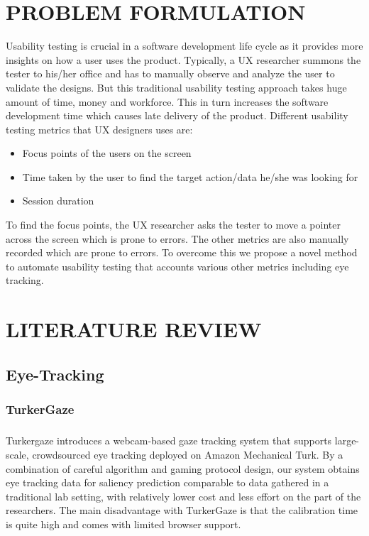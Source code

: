 \documentclass[12pt,a4paper,final]{extreport}
\begin{document}
\chapter{PROBLEM FORMULATION}
\vspace{0.3cm}
Usability testing is crucial in a software development life cycle as it provides more insights
on how a user uses the product. Typically, a UX researcher summons the tester to his/her office
and has to manually observe and analyze the user to validate the designs. But this traditional
usability testing approach takes huge amount of time, money and workforce. This in turn
increases the software development time which causes late delivery of the product. Different
usability testing metrics that UX designers uses are:
\begin{itemize}
    \item Focus points of the users on the screen
    \item Time taken by the user to find the target action/data he/she was looking for
    \item Session duration
\end{itemize}
To find the focus points, the UX researcher asks the tester to move a pointer across the
screen which is prone to errors. The other metrics are also manually recorded which are prone
to errors. To overcome this we propose a novel method to automate usability testing that accounts
various other metrics including eye tracking.


\newpage
\chapter{LITERATURE REVIEW}
\section{Eye-Tracking}
\subsection{TurkerGaze}
\paragraph{}
Turkergaze introduces a webcam-based gaze tracking system that supports large-scale, crowdsourced eye tracking deployed on Amazon Mechanical Turk. By a combination of careful algorithm and gaming protocol design, our system obtains eye tracking data for saliency prediction comparable to data gathered in a traditional lab setting, with relatively lower cost and less effort on the part of the researchers.
The main disadvantage with TurkerGaze is that the calibration time is quite high and comes with limited browser support.
\end{document}
